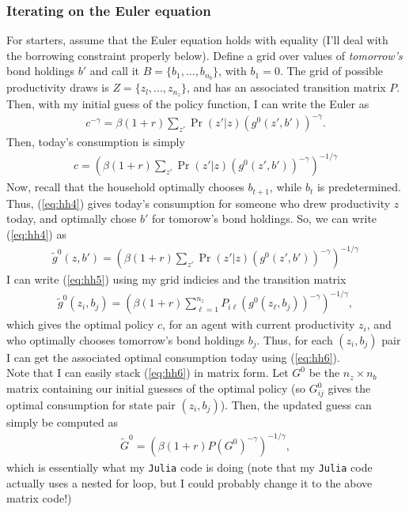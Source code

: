 \documentclass[12pt]{article}
\newcommand{\mtx}[1]{\ensuremath{\bm{\mathit{#1}}}}
\begin{document}
\subsubsection{Iterating on the Euler equation}
For starters, assume that the Euler equation holds with equality (I'll deal with the borrowing constraint properly below). Define a grid over values of \textit{tomorrow's} bond holdings $b'$ and call it $B = \{b_1, ...,b_{n_b}\}$, with $b_1 = 0$. The grid of possible productivity draws is $Z=\{z_l, ..., z_{n_z}\}$, and has an associated transition matrix $\mtx{P}$. Then, with my initial guess of the policy function, I can write the Euler as
\begin{align*}
c^{-\gamma} = \beta(1+r) \sum_{z'}\Pr(z'|z)(g^0(z',b'))^{-\gamma}.
\end{align*}
Then, today's consumption is simply
\begin{align}
c = \left( \beta(1+r) \sum_{z'}\Pr(z'|z)(g^0(z',b'))^{-\gamma}\right)^{-1/\gamma} \label{eq:hh4}
\end{align}
Now, recall that the household optimally chooses $b_{t+1}$, while $b_t$ is predetermined. Thus, (\ref{eq:hh4}) gives today's consumption for someone who drew productivity $z$ today, and optimally chose $b'$ for tomorow's bond holdings. So, we can write (\ref{eq:hh4}) as
\begin{align}
\tilde g^0(z,b') = \left( \beta(1+r) \sum_{z'}\Pr(z'|z)(g^0(z',b'))^{-\gamma}\right)^{-1/\gamma} \label{eq:hh5}
\end{align}
I can write (\ref{eq:hh5}) using my grid indicies and the transition matrix
\begin{align}
\tilde g^0(z_i,b_j) = \left( \beta(1+r) \sum_{\ell=1}^{n_z}\mtx{P}_{i\ell} (g^0(z_\ell,b_j))^{-\gamma}\right)^{-1/\gamma} \label{eq:hh6}, 
\end{align}
which gives the optimal policy $c$, for an agent with current productivity $z_i$, and who optimally chooses tomorrow's bond holdings $b_j$. Thus, for each $(z_i,b_j)$ pair I can get the associated optimal consumption today using (\ref{eq:hh6}).\\

Note that I can easily stack (\ref{eq:hh6}) in matrix form. Let $\mtx{G}^0$ be the $n_z \times n_b$ matrix containing our initial guesses of the optimal policy (so $\mtx{G}^0_{ij}$ gives the optimal consumption for state pair $(z_i,b_j)$). Then, the updated guess can simply be computed as
\begin{align*}
\widetilde{\mtx{G}}^0 = \left( \beta(1+r) \mtx{P} (\mtx{G}^0)^{-\gamma}\right)^{-1/\gamma},
\end{align*}
which is essentially what my \verb|Julia| code is doing (note that my \verb|Julia| code actually uses a nested for loop, but I could probably change it to the above matrix code!)\\
\end{document}
